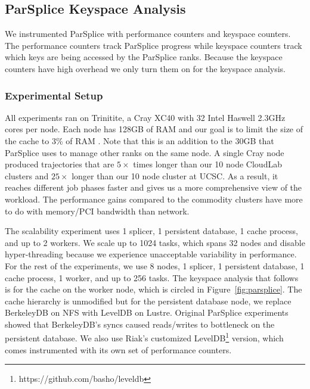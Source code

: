 \subsection{ParSplice Keyspace Analysis}
\label{sec:parsplice-keyspace-analysis}

We instrumented ParSplice with performance counters and keyspace counters.  The
performance counters track ParSplice progress while keyspace counters track
which keys are being accessed by the ParSplice ranks. Because the keyspace
counters have high overhead we only turn them on for the keyspace analysis.

\subsubsection*{Experimental Setup} All experiments ran on Trinitite, a Cray
XC40 with 32 Intel Haswell 2.3GHz cores per node.  Each node has 128GB of RAM
and our goal is to limit the size of the cache to 3\% of RAM . Note that this
is an addition to the 30GB that ParSplice uses to manage other ranks on the
same node.  A single Cray node produced trajectories that are \(5\times\) times
longer than our 10 node CloudLab clusters and \(25\times\) longer than our 10
node cluster at UCSC. As a result, it reaches different job phases faster and
gives us a more comprehensive view of the workload. The performance gains
compared to the commodity clusters have more to do with memory/PCI bandwidth
than network.

The scalability experiment uses 1 splicer, 1 persistent database, 1 cache
process, and up to 2 workers. We scale up to 1024 tasks, which spans 32 nodes
and disable hyper-threading because we experience unacceptable variability in
performance. For the rest of the experiments, we use 8 nodes, 1 splicer, 1
persistent database, 1 cache process, 1 worker, and up to 256 tasks.  The
keyspace analysis that follows is for the cache on the worker node, which is
circled in Figure~\ref{fig:parsplice}.  The cache hierarchy is unmodified but
for the persistent database node, we replace BerkeleyDB on NFS with LevelDB on
Lustre. Original ParSplice experiments showed that BerkeleyDB's syncs caused
reads/writes to bottleneck on the persistent database. We also use Riak's
customized LevelDB\footnote{https://github.com/basho/leveldb} version, which
comes instrumented with its own set of performance counters.

